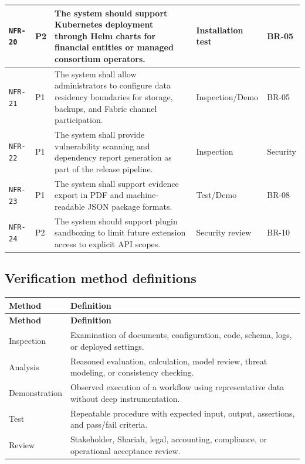 \documentclass[11pt,a4paper]{article}
\begin{document}
\begin{footnotesize}
\begin{longtable}{@{}p{}p{}p{}p{}p{}@{}}
\texttt{NFR-20} & P2 & The system should support Kubernetes deployment through Helm charts for financial entities or managed consortium operators. & Installation test & BR-05 \\ \hline
\texttt{NFR-21} & P1 & The system shall allow administrators to configure data residency boundaries for storage, backups, and Fabric channel participation. & Inspection/Demo & BR-05 \\ \hline
\texttt{NFR-22} & P1 & The system shall provide vulnerability scanning and dependency report generation as part of the release pipeline. & Inspection & Security \\ \hline
\texttt{NFR-23} & P1 & The system shall support evidence export in PDF and machine-readable JSON package formats. & Test/Demo & BR-08 \\ \hline
\texttt{NFR-24} & P2 & The system should support plugin sandboxing to limit future extension access to explicit API scopes. & Security review & BR-10 \\ \hline
\end{longtable}
\end{footnotesize}
\subsection{Verification method definitions}
\begin{footnotesize}
\begin{longtable}{@{}p{}p{}@{}}
\rowcolor{gray!18}\textbf{Method} & \textbf{Definition} \\ \hline
\endfirsthead
\rowcolor{gray!18}\textbf{Method} & \textbf{Definition} \\ \hline
\endhead
Inspection & Examination of documents, configuration, code, schema, logs, or deployed settings. \\ \hline
Analysis & Reasoned evaluation, calculation, model review, threat modeling, or consistency checking. \\ \hline
Demonstration & Observed execution of a workflow using representative data without deep instrumentation. \\ \hline
Test & Repeatable procedure with expected input, output, assertions, and pass/fail criteria. \\ \hline
Review & Stakeholder, Shariah, legal, accounting, compliance, or operational acceptance review. \\ \hline
\end{longtable}
\end{footnotesize}
\end{document}

